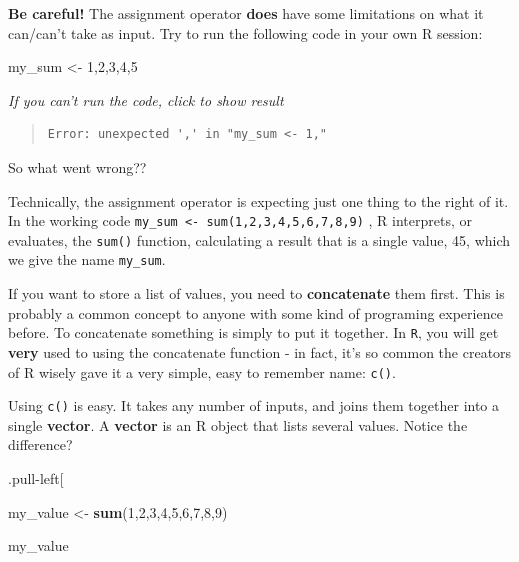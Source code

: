 \documentclass[
]{book}
\newenvironment{Shaded}{\begin{snugshade}}{\end{snugshade}}
\newcommand{\DecValTok}[1]{\textcolor[rgb]{0.00,0.00,0.81}{#1}}
\newcommand{\FunctionTok}[1]{\textcolor[rgb]{0.13,0.29,0.53}{\textbf{#1}}}
\newcommand{\NormalTok}[1]{#1}
\newcommand{\OtherTok}[1]{\textcolor[rgb]{0.56,0.35,0.01}{#1}}
\begin{document}
\textbf{Be careful!} The assignment operator \textbf{does} have some limitations on what it can/can't take as input. Try to run the following code in your own R session:

\begin{Shaded}
\begin{Highlighting}[]
\NormalTok{my\_sum }\OtherTok{\textless{}{-}} \DecValTok{1}\NormalTok{,}\DecValTok{2}\NormalTok{,}\DecValTok{3}\NormalTok{,}\DecValTok{4}\NormalTok{,}\DecValTok{5}
\end{Highlighting}
\end{Shaded}

\emph{If you can't run the code, click to show result}

\begin{quote}
\begin{verbatim}
Error: unexpected ',' in "my_sum <- 1,"
\end{verbatim}
\end{quote}

So what went wrong??

Technically, the assignment operator is expecting just one thing to the right of it. In the working code \texttt{my\_sum\ \textless{}-\ sum(1,2,3,4,5,6,7,8,9)} , R interprets, or evaluates, the \texttt{sum()} function, calculating a result that is a single value, 45, which we give the name \texttt{my\_sum}.

If you want to store a list of values, you need to \textbf{concatenate} them first. This is probably a common concept to anyone with some kind of programing experience before. To concatenate something is simply to put it together. In \texttt{R}, you will get \textbf{very} used to using the concatenate function - in fact, it's so common the creators of R wisely gave it a very simple, easy to remember name: \texttt{c()}.

Using \texttt{c()} is easy. It takes any number of inputs, and joins them together into a single \textbf{vector}. A \textbf{vector} is an R object that lists several values. Notice the difference?

.pull-left{[}

\begin{Shaded}
\begin{Highlighting}[]
\NormalTok{my\_value }\OtherTok{\textless{}{-}} \FunctionTok{sum}\NormalTok{(}\DecValTok{1}\NormalTok{,}\DecValTok{2}\NormalTok{,}\DecValTok{3}\NormalTok{,}\DecValTok{4}\NormalTok{,}\DecValTok{5}\NormalTok{,}\DecValTok{6}\NormalTok{,}\DecValTok{7}\NormalTok{,}\DecValTok{8}\NormalTok{,}\DecValTok{9}\NormalTok{)}

\NormalTok{my\_value}
\end{Highlighting}
\end{Shaded}
\end{document}
